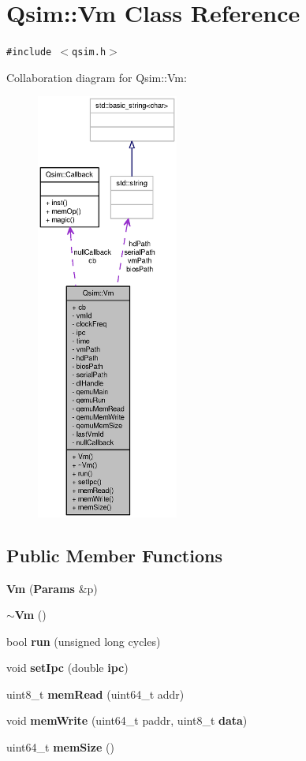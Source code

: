 \section{Qsim::Vm Class Reference}
\label{classQsim_1_1Vm}
{\tt \#include $<$qsim.h$>$}

Collaboration diagram for Qsim::Vm:\nopagebreak
\begin{figure}[H]
\begin{center}
\leavevmode
\includegraphics[height=400pt]{classQsim_1_1Vm__coll__graph}
\end{center}
\end{figure}
\subsection*{Public Member Functions}
\begin{CompactItemize}
\item 
{\bf Vm} ({\bf Params} \&p)
\item 
{\bf $\sim$Vm} ()
\item 
bool {\bf run} (unsigned long cycles)
\item 
void {\bf setIpc} (double {\bf ipc})
\item 
uint8\_\-t {\bf memRead} (uint64\_\-t addr)
\item 
void {\bf memWrite} (uint64\_\-t paddr, uint8\_\-t {\bf data})
\item 
uint64\_\-t {\bf memSize} ()
\end{CompactItemize}
